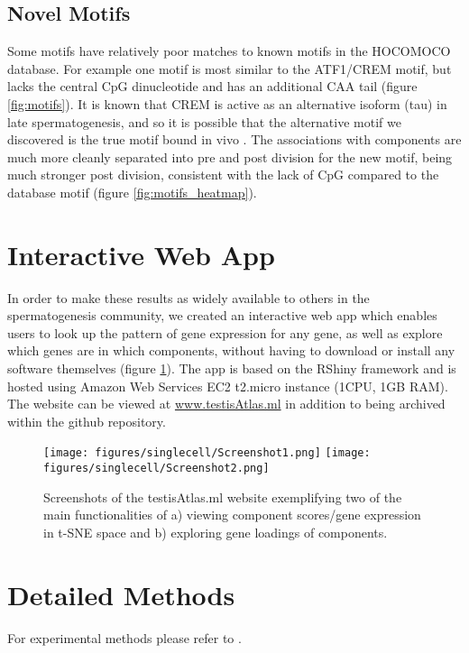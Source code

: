  
\subsection{Novel Motifs}

Some motifs have relatively poor matches to known motifs in the HOCOMOCO database. For example one motif is most similar to the ATF1/CREM motif, but lacks the central CpG dinucleotide and has an additional CAA tail (figure \ref{fig:motifs}). It is known that CREM is active as an alternative isoform (tau) in late spermatogenesis, and so it is possible that the alternative motif we discovered is the true motif bound in vivo \parencite{Sassone-Corsi2000CREM}. The associations with components are much more cleanly separated into pre and post division for the new motif, being much stronger post division, consistent with the lack of CpG compared to the database motif (figure \ref{fig:motifs_heatmap}).



\section{Interactive Web App}
In order to make these results as widely available to others in the spermatogenesis community, we created an interactive web app which enables users to look up the pattern of gene expression for any gene, as well as explore which genes are in which components, without having to download or install any software themselves (figure \ref{fig:shiny}). The app is based on the RShiny framework and is hosted using Amazon Web Services EC2 t2.micro instance (1CPU, 1GB RAM). The website can be viewed at \url{www.testisAtlas.ml} in addition to being archived within the github repository.

\begin{figure}[H]
	\centering
	\texttt{[image: figures/singlecell/Screenshot1.png]}
	\texttt{[image: figures/singlecell/Screenshot2.png]}
	\caption[Interactive Web Application]{
		Screenshots of the testisAtlas.ml website exemplifying two of the main functionalities of a) viewing component scores/gene expression in t-SNE space and b) exploring gene loadings of components.
	}
	\label{fig:shiny}
\end{figure}


\section{Detailed Methods}
For experimental methods please refer to \cite{Jung2019Unified}.

